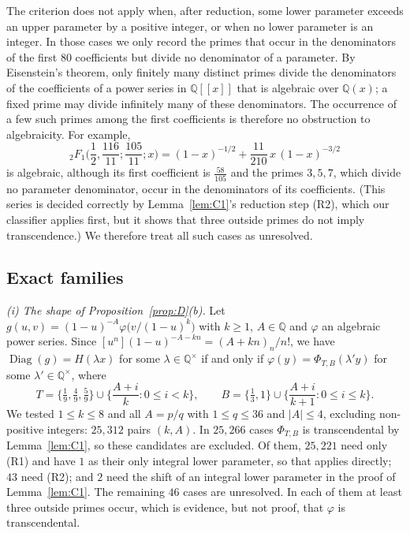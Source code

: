 \documentclass[11pt]{amsart}
\theoremstyle{definition}
\theoremstyle{remark}
\numberwithin{equation}{section}
\newcommand{\Q}{\mathbb{Q}}
\DeclareMathOperator{\Diag}{Diag}
\begin{document}
The criterion does not apply when, after reduction, some lower parameter exceeds an upper parameter by a positive integer, or when no lower parameter is an integer. In those cases we only record the primes that occur in the denominators of the first $80$ coefficients but divide no denominator of a parameter. By Eisenstein's theorem, only finitely many distinct primes divide the denominators of the coefficients of a power series in $\Q[[x]]$ that is algebraic over $\Q(x)$; a fixed prime may divide infinitely many of these denominators. The occurrence of a few such primes among the first coefficients is therefore no obstruction to algebraicity. For example,
\begin{equation}\label{eq:refex}
{}_2F_1\Big(\frac12,\frac{116}{11};\frac{105}{11};x\Big)=(1-x)^{-1/2}+\frac{11}{210}\,x\,(1-x)^{-3/2}
\end{equation}
is algebraic, although its first coefficient is $\frac{58}{105}$ and the primes $3,5,7$, which divide no parameter denominator, occur in the denominators of its coefficients. (This series is decided correctly by Lemma~\ref{lem:C1}'s reduction step (R2), which our classifier applies first, but it shows that three outside primes do not imply transcendence.) We therefore treat all such cases as unresolved.

\subsection*{Exact families}
\emph{(i) The shape of Proposition~\ref{prop:D}(b).} Let $g(u,v)=(1-u)^{-A}\varphi\big(v/(1-u)^k\big)$ with $k\ge1$, $A\in\Q$ and $\varphi$ an algebraic power series. Since $[u^n](1-u)^{-A-kn}=(A+kn)_n/n!$, we have $\Diag(g)=H(\lambda x)$ for some $\lambda\in\Q^\times$ if and only if $\varphi(y)=\Phi_{T,B}(\lambda'y)$ for some $\lambda'\in\Q^\times$, where
\[
T=\big\{\tfrac19,\tfrac49,\tfrac59\big\}\cup\Big\{\frac{A+i}k:0\le i<k\Big\},\qquad B=\big\{\tfrac13,1\big\}\cup\Big\{\frac{A+i}{k+1}:0\le i\le k\Big\}.
\]
We tested $1\le k\le8$ and all $A=p/q$ with $1\le q\le36$ and $|A|\le4$, excluding non-positive integers: $25{,}312$ pairs $(k,A)$. In $25{,}266$ cases $\Phi_{T,B}$ is transcendental by Lemma~\ref{lem:C1}, so these candidates are excluded. Of them, $25{,}221$ need only (R1) and have $1$ as their only integral lower parameter, so that \citet[Theorem~4.8]{BeukersHeckman1989} applies directly; $43$ need (R2); and $2$ need the shift of an integral lower parameter in the proof of Lemma~\ref{lem:C1}. The remaining $46$ cases are unresolved. In each of them at least three outside primes occur, which is evidence, but not proof, that $\varphi$ is transcendental.
\end{document}
